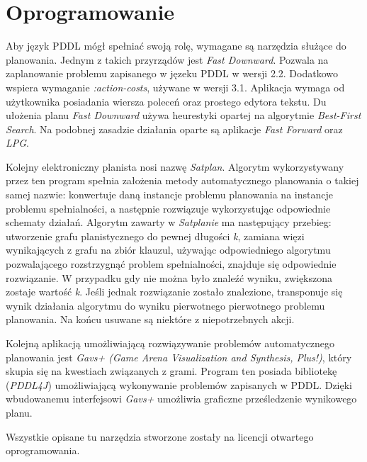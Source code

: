\section{Oprogramowanie}
Aby język PDDL mógł spełniać swoją rolę, wymagane są narzędzia służące do planowania. Jednym z takich przyrządów jest \textit{Fast Downward}. Pozwala na zaplanowanie problemu zapisanego w jęzeku PDDL w wersji 2.2. Dodatkowo wspiera wymaganie \textit{:action-costs}, używane w wersji 3.1. Aplikacja wymaga od użytkownika posiadania wiersza poleceń oraz prostego edytora tekstu. Du ułożenia planu \textit{Fast Downward} używa heurestyki opartej na algorytmie \textit{Best-First Search}. Na podobnej zasadzie działania oparte są aplikacje \textit{Fast Forward} oraz \textit{LPG}.

Kolejny elektroniczny planista nosi nazwę \textit{Satplan}. Algorytm wykorzystywany przez ten program spełnia założenia metody automatycznego planowania o takiej samej nazwie: konwertuje daną instancje problemu planowania na instancje problemu spełnialności, a następnie rozwiązuje wykorzystując odpowiednie schematy działań. Algorytm zawarty w \textit{Satplanie} ma następujący przebieg: utworzenie grafu planistycznego do pewnej długości \textit{k}, zamiana więzi wynikających z grafu na zbiór klauzul, używając odpowiedniego algorytmu pozwalającego rozstrzygnąć problem spełnialności, znajduje się odpowiednie rozwiązanie. W przypadku gdy nie można było znaleźć wyniku, zwiększona zostaje wartość \textit{k}. Jeśli jednak rozwiązanie zostało znalezione, transponuje się wynik działania algorytmu do wyniku pierwotnego pierwotnego problemu planowania. Na końcu usuwane są niektóre z niepotrzebnych akcji.

Kolejną aplikacją umożliwiającą rozwiązywanie problemów automatycznego planowania jest \textit{Gavs+ (Game Arena Visualization and Synthesis, Plus!)}, który skupia się na kwestiach związanych z grami. Program ten posiada bibliotekę (\textit{PDDL4J}) umożliwiającą wykonywanie problemów zapisanych w PDDL. Dzięki wbudowanemu interfejsowi \textit{Gavs+} umożliwia graficzne prześledzenie wynikowego planu.

Wszystkie opisane tu narzędzia stworzone zostały na licencji otwartego oprogramowania.

